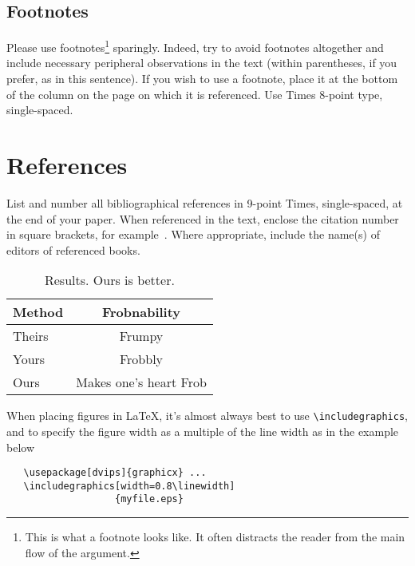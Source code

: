 \documentclass[10pt,twocolumn,letterpaper]{article}
\begin{document}
\subsection{Footnotes}

Please use footnotes\footnote {This is what a footnote looks like.  It
often distracts the reader from the main flow of the argument.} sparingly.
Indeed, try to avoid footnotes altogether and include necessary peripheral
observations in
the text (within parentheses, if you prefer, as in this sentence).  If you
wish to use a footnote, place it at the bottom of the column on the page on
which it is referenced. Use Times 8-point type, single-spaced.


\section{References}

List and number all bibliographical references in 9-point Times,
single-spaced, at the end of your paper. When referenced in the text,
enclose the citation number in square brackets, for
example~\cite{Authors14}.  Where appropriate, include the name(s) of
editors of referenced books.

\begin{table}
\begin{center}
\begin{tabular}{|l|c|}
\hline
Method & Frobnability \\
\hline\hline
Theirs & Frumpy \\
Yours & Frobbly \\
Ours & Makes one's heart Frob\\
\hline
\end{tabular}
\end{center}
\caption{Results.   Ours is better.}
\end{table}

When placing figures in \LaTeX, it's almost always best to use
\verb+\includegraphics+, and to specify the  figure width as a multiple of
the line width as in the example below
{\small\begin{verbatim}
   \usepackage[dvips]{graphicx} ...
   \includegraphics[width=0.8\linewidth]
                   {myfile.eps}
\end{verbatim}
}

{\small


}
\end{document}
